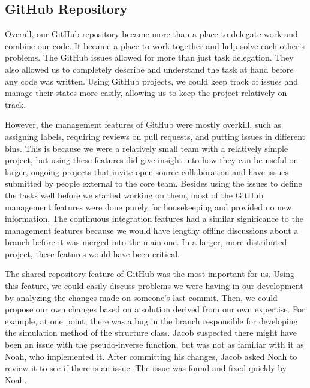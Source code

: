 \subsection{GitHub Repository}
Overall, our GitHub repository became more than a place to delegate work and combine our code. It became a place to work together and help solve each other's problems. The GitHub issues allowed for more than just task delegation. They also allowed us to completely describe and understand the task at hand before any code was written. Using GitHub projects, we could keep track of issues and manage their states more easily, allowing us to keep the project relatively on track. 

However, the management features of GitHub were mostly overkill, such as assigning labels, requiring reviews on pull requests, and putting issues in different bins. This is because we were a relatively small team with a relatively simple project, but using these features did give insight into how they can be useful on larger, ongoing projects that invite open-source collaboration and have issues submitted by people external to the core team. Besides using the issues to define the tasks well before we started working on them, most of the GitHub management features were done purely for housekeeping and provided no new information. The continuous integration features had a similar significance to the management features because we would have lengthy offline discussions about a branch before it was merged into the main one. In a larger, more distributed project, these features would have been critical.

The shared repository feature of GitHub was the most important for us. Using this feature, we could easily discuss problems we were having in our development by analyzing the changes made on someone's last commit. Then, we could propose our own changes based on a solution derived from our own expertise. For example, at one point, there was a bug in the branch responsible for developing the simulation method of the structure class. Jacob suspected there might have been an issue with the pseudo-inverse function, but was not as familiar with it as Noah, who implemented it. After committing his changes, Jacob asked Noah to review it to see if there is an issue. The issue was found and fixed quickly by Noah.
